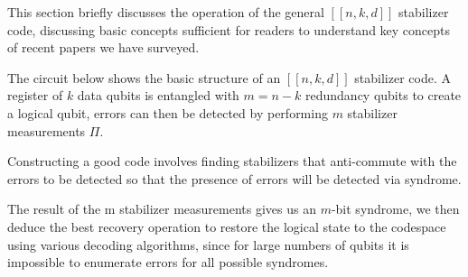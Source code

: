 
This section briefly discusses the operation of the general $[[n, k, d]]$ stabilizer code, discussing basic concepts sufficient for readers to understand key concepts of recent papers we have surveyed.

The circuit below shows the basic structure of an $[[n,k,d]]$ stabilizer code. A register of $k$ data qubits is entangled with $m = n - k$ redundancy qubits to create a logical qubit, errors can then be detected by performing $m$ stabilizer measurements $\Pi$.

Constructing a good code involves finding stabilizers that anti-commute with the errors to be detected so that the presence of errors will be detected via syndrome.

The result of the m stabilizer measurements gives us an $m$-bit syndrome, we then deduce the best recovery operation to restore the logical state to the codespace using various decoding algorithms, since for large numbers of qubits it is impossible to enumerate errors for all possible syndromes.
